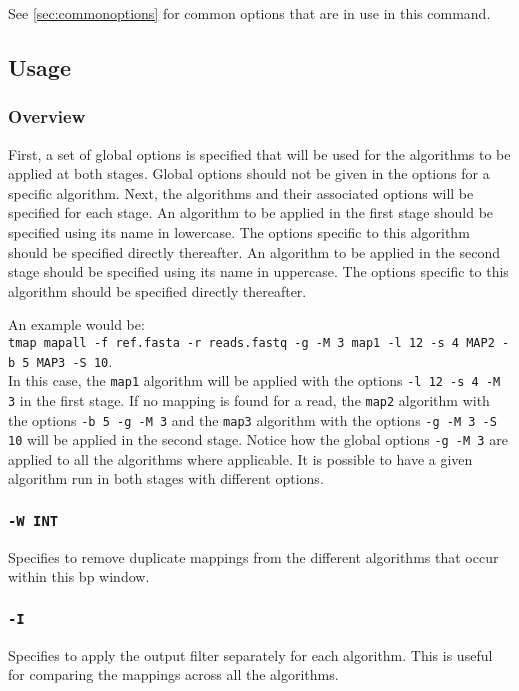\documentclass[a4paper,12pt]{book}
\newcommand{\TT}[1]{{\tt #1}} %
\begin{document}
See \autoref{sec:commonoptions} for common options that are in use in this command.

\subsection{Usage}

\subsubsection{Overview}
First, a set of global options is specified that will be used for the algorithms to be applied at both stages.
Global options should not be given in the options for a specific algorithm.
Next, the algorithms and their associated options will be specified for each stage.
An algorithm to be applied in the first stage should be specified using its name in lowercase.
The options specific to this algorithm should be specified directly thereafter.
An algorithm to be applied in the second stage should be specified using its name in uppercase.
The options specific to this algorithm should be specified directly thereafter.

An example would be:\\
\TT{tmap mapall -f ref.fasta -r reads.fastq -g -M 3 map1 -l 12 -s 4 MAP2 -b 5 MAP3 -S 10}.\\
In this case, the \TT{map1} algorithm will be applied with the options \TT{-l 12 -s 4 -M 3} in the first stage.
If no mapping is found for a read, the \TT{map2} algorithm with the options \TT{-b 5 -g -M 3} and the \TT{map3} algorithm with the options \TT{-g -M 3 -S 10} will be applied in the second stage.
Notice how the global options \TT{-g -M 3} are applied to all the algorithms where applicable.
It is possible to have a given algorithm run in both stages with different options.

\subsubsection{\TT{-W INT}}
Specifies to remove duplicate mappings from the different algorithms that occur within this bp window.

\subsubsection{\TT{-I}}
Specifies to apply the output filter separately for each algorithm.
This is useful for comparing the mappings across all the algorithms.
\end{document}
